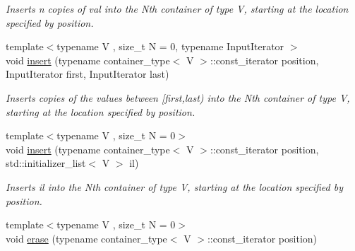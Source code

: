 \begin{DoxyCompactItemize}
\begin{DoxyCompactList}\small\item\em Inserts n copies of val into the Nth container of type V, starting at the location specified by position. \end{DoxyCompactList}\item 
\hypertarget{classheterogeneous_1_1heterovector_3_01_t_01_4_a39b3c267bcb6da4f3f83e675d19e1976}{}{\footnotesize template$<$typename V , size\+\_\+t N = 0, typename Input\+Iterator $>$ }\\void \hyperlink{classheterogeneous_1_1heterovector_3_01_t_01_4_a39b3c267bcb6da4f3f83e675d19e1976}{insert} (typename container\+\_\+type$<$ V $>$\+::const\+\_\+iterator position, Input\+Iterator first, Input\+Iterator last)\label{classheterogeneous_1_1heterovector_3_01_t_01_4_a39b3c267bcb6da4f3f83e675d19e1976}

\begin{DoxyCompactList}\small\item\em Inserts copies of the values between \mbox{[}first,last) into the Nth container of type V, starting at the location specified by position. \end{DoxyCompactList}\item 
\hypertarget{classheterogeneous_1_1heterovector_3_01_t_01_4_a34b253f91d499155c25fb02a8eae9d05}{}{\footnotesize template$<$typename V , size\+\_\+t N = 0$>$ }\\void \hyperlink{classheterogeneous_1_1heterovector_3_01_t_01_4_a34b253f91d499155c25fb02a8eae9d05}{insert} (typename container\+\_\+type$<$ V $>$\+::const\+\_\+iterator position, std\+::initializer\+\_\+list$<$ V $>$ il)\label{classheterogeneous_1_1heterovector_3_01_t_01_4_a34b253f91d499155c25fb02a8eae9d05}

\begin{DoxyCompactList}\small\item\em Inserts il into the Nth container of type V, starting at the location specified by position. \end{DoxyCompactList}\item 
\hypertarget{classheterogeneous_1_1heterovector_3_01_t_01_4_a014e7cd7dffd5e691a86d9b77d486efd}{}{\footnotesize template$<$typename V , size\+\_\+t N = 0$>$ }\\void \hyperlink{classheterogeneous_1_1heterovector_3_01_t_01_4_a014e7cd7dffd5e691a86d9b77d486efd}{erase} (typename container\+\_\+type$<$ V $>$\+::const\+\_\+iterator position)\label{classheterogeneous_1_1heterovector_3_01_t_01_4_a014e7cd7dffd5e691a86d9b77d486efd}


\end{DoxyCompactItemize}
